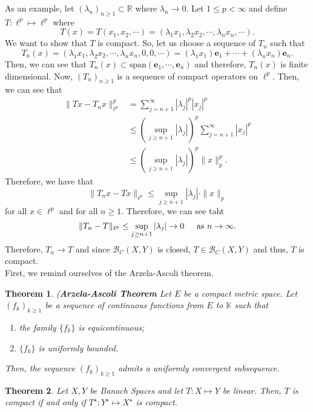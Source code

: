 \documentclass[12pt]{article}
\newtheorem{theorem}{Theorem}
\newcommand{\R}{{\mathbb R}}
\def\K{\mathbb{K}}
\newcommand{\B}{\mathscr{B}}
\newcommand{\sbs}{\subset}
\newcommand{\Xs}{X^{\star}}
\newcommand{\Ts}{T^{\star}}
\newcommand{\Ys}{Y^{\star}}
\begin{document}
As an example, let $(\lambda_n)_{n \geq 1} \sbs \R$ where $\lambda_n \to 0$. Let $1 \leq p < \infty$ and define $T: \ell^p \mapsto \ell^p$ where 
\[ T(x) = T(x_1, x_2, \cdots) = (\lambda_1 x_1, \lambda_2 x_2, \cdots, \lambda_n x_n, \cdots).\]
We want to show that $T$ is compact. So, let us choose a sequence of $T_n$ such that 
\[ T_n(x) = (\lambda_1 x_1, \lambda_2 x_2, \cdots, \lambda_n x_n, 0, 0, \cdots) = (\lambda_1 x_1) \mathbf{e}_1 + \cdots + (\lambda_n x_n)\mathbf{e}_n.\]
Then, we can see that $T_n(x) \sbs \text{span}(\mathbf{e}_1, \cdots, \mathbf{e}_n)$ and therefore, $T_n(x)$ is finite dimensional. Now, $(T_n)_{n \geq 1}$ is a sequence of compact operators on $\ell^p$. Then, we can see that 
\begin{align*}
\| T x - T_n x \|_{\ell^p}^p & = \sum\limits_{j = n + 1}^{\infty} |\lambda_j|^p |x_j|^p \\
& \leq \left(\sup\limits_{j \geq n + 1} |\lambda_j| \right)^p \sum\limits_{j = n + 1}^{\infty} |x_j|^p \\
& \leq \left(\sup\limits_{j \geq n + 1} |\lambda_j| \right)^p \| x \|_p^p.
\end{align*} 
Therefore, we have that 
\[\| T_n x - Tx \|_{\ell^p} \leq\sup\limits_{j \geq n + 1} |\lambda_j| \cdot \| x \|_p \]
for all $x \in \ell^p$ and for all $n\geq 1$. Therefore, we can see taht 
\[ \| T_n  - T \|_{\ell^p} \leq\sup\limits_{j \geq n + 1} |\lambda_j| \to 0 \hspace{4mm} \text{ as } n \to \infty.\]
Therefore, $T_n \to T$ and since $\B_C(X, Y)$ is closed, $T \in \B_C(X, Y)$ and thus, $T$ is compact. \\
First, we remind ourselves of the Arzela-Ascoli theorem. 
\begin{theorem}(\textbf{Arzela-Ascoli Theorem}
Let $E$ be a compact metric space. Let $(f_k)_{k \geq 1}$ be a sequence of continuous functions from $E$ to $\K$ such that 
\begin{enumerate}[topsep=-15pt, itemsep=0pt]
\item[(i)] the family $\{ f_k \}$ is equicontinuous;
\item[(ii)] $\{ f_k \}$ is uniformly bounded.
\end{enumerate}
Then, the sequence $(f_k)_{k \geq 1}$ admits a uniformly convergent subsequence.
\end{theorem}
\begin{theorem}
Let $X, Y$ be Banach Spaces and let $T: X \mapsto Y$ be linear. Then, $T$ is compact if and only if $\Ts: \Ys \mapsto \Xs$ is compact. 
\end{theorem}
\end{document}
